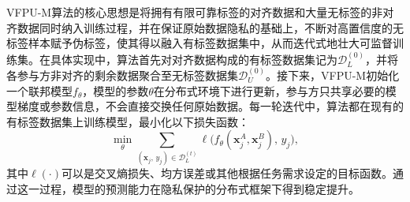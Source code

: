VFPU-M算法的核心思想是将拥有有限可靠标签的对齐数据和大量无标签的非对齐数据同时纳入训练过程，并在保证原始数据隐私的基础上，不断对高置信度的无标签样本赋予伪标签，使其得以融入有标签数据集中，从而迭代式地壮大可监督训练集。在具体实现中，算法首先对对齐数据构成的有标签数据集记为$\mathcal{D}_L^{(0)}$，并将各参与方非对齐的剩余数据聚合至无标签数据集$\mathcal{D}_U^{(0)}$。接下来，VFPU-M初始化一个联邦模型$f_{\theta}$，模型的参数$\theta$在分布式环境下进行更新，参与方只共享必要的模型梯度或参数信息，不会直接交换任何原始数据。每一轮迭代中，算法都在现有的有标签数据集上训练模型，最小化以下损失函数：
\begin{equation}
	\min_{\theta} \sum_{(\mathbf{x}_j,\, y_j) \in \mathcal{D}_L^{(t)}} \ell \bigl(f_{\theta}(\mathbf{x}^A_j,\mathbf{x}^B_j),\, y_j\bigr),
\end{equation}
其中$\ell(\cdot)$可以是交叉熵损失、均方误差或其他根据任务需求设定的目标函数。通过这一过程，模型的预测能力在隐私保护的分布式框架下得到稳定提升。


